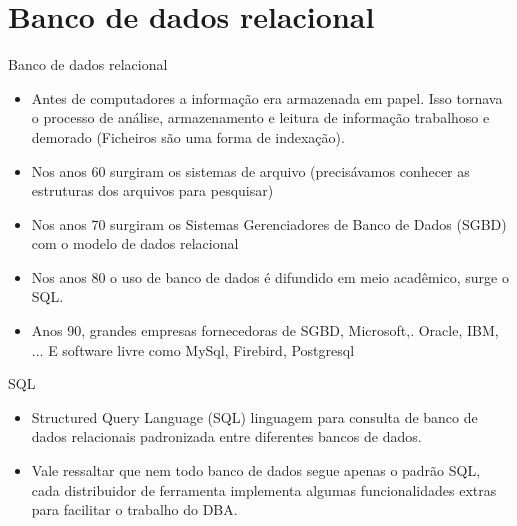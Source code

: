 \section{Banco de dados relacional}

\begin{frame}
	\begin{block}{Banco de dados relacional}
		\begin{itemize}
			\item Antes de computadores a informação era armazenada em papel. Isso tornava o processo de análise, armazenamento e leitura de informação trabalhoso e demorado (Ficheiros são uma forma de indexação).
			
			\item Nos anos 60 surgiram os sistemas de arquivo (precisávamos conhecer as estruturas dos arquivos para pesquisar)
			
			\item Nos anos 70 surgiram os Sistemas Gerenciadores de Banco de Dados (SGBD) com o modelo de dados relacional
			
			\item Nos anos 80 o uso de banco de dados é difundido em meio acadêmico, surge o SQL.
			
			\item Anos 90, grandes empresas fornecedoras de SGBD, Microsoft,. Oracle, IBM, ... E software livre como MySql, Firebird, Postgresql
		\end{itemize}
	\end{block}
\end{frame}

\begin{frame}
	\begin{block}{SQL}
		\begin{itemize}
			\item Structured Query Language (SQL) linguagem para consulta de banco de dados relacionais padronizada entre diferentes bancos de dados. 

			\item Vale ressaltar que nem todo banco de dados segue apenas o padrão SQL, cada distribuidor de ferramenta implementa algumas funcionalidades extras para facilitar o trabalho do DBA.
		\end{itemize}
	\end{block}
\end{frame}

